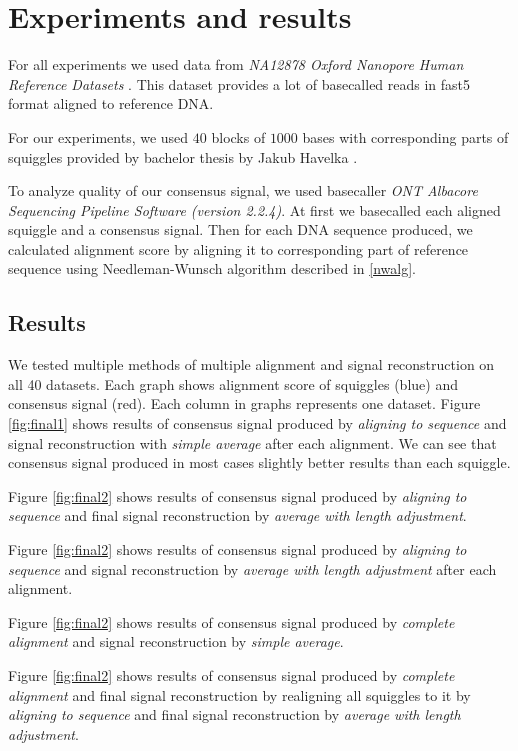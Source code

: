 \chapter{Experiments and results}

\label{kap:experiments} %

For all experiments we used data from \textit{NA12878 Oxford Nanopore Human Reference Datasets} \cite{data}. 
This dataset provides a lot of basecalled reads in fast5 format aligned to reference DNA. 

For our experiments, we used $40$ blocks of $1000$ bases with corresponding parts of squiggles provided by 
bachelor thesis by Jakub Havelka \cite{kubo}.

To analyze quality of our consensus signal, we used basecaller \textit{ONT Albacore Sequencing Pipeline Software (version 2.2.4)}.
At first we basecalled each aligned squiggle and a consensus signal. 
Then for each DNA sequence produced, we calculated alignment
score by aligning it to corresponding part of reference sequence 
using Needleman-Wunsch algorithm described in \ref{nwalg}.

\section{Results}
We tested multiple methods of multiple alignment and signal reconstruction on all 40 datasets.
Each graph shows alignment score of squiggles (blue) and consensus signal (red).
Each column in graphs represents one dataset.
Figure \ref{fig:final1} shows results of consensus signal produced by \textit{aligning to sequence} and 
signal reconstruction with \textit{simple average} after each alignment. We can see that consensus signal produced 
in most cases slightly better results than each squiggle.

Figure \ref{fig:final2} shows results of consensus signal produced by \textit{aligning to sequence} and
final signal reconstruction by \textit{average with length adjustment}. 

Figure \ref{fig:final2} shows results of consensus signal produced by \textit{aligning to sequence} and
signal reconstruction by \textit{average with length adjustment} after each alignment.

Figure \ref{fig:final2} shows results of consensus signal produced by \textit{complete alignment} and 
signal reconstruction by \textit{simple average}.

Figure \ref{fig:final2} shows results of consensus signal produced by \textit{complete alignment} and 
final signal reconstruction by realigning all squiggles to it by \textit{aligning to sequence} and
final signal reconstruction by \textit{average with length adjustment}.

